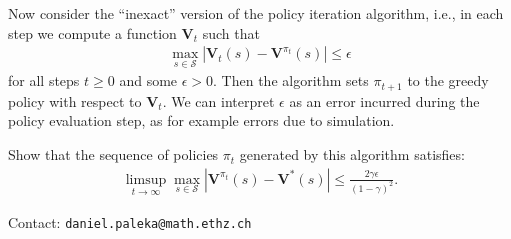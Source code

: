 Now consider the ``inexact'' version of the policy iteration algorithm, i.e., in each step we compute a function $\mathbf{V}_t$ such that
\begin{align*}
    \max_{s \in \mathcal{S}} | \mathbf{V}_t(s) - \mathbf{V}^{\pi_t}(s) | \le \epsilon
\end{align*}
for all steps $t \ge 0$ and some $\epsilon > 0$. Then the algorithm sets $\pi_{t+1}$ to the greedy policy with respect to $\mathbf{V}_t$. We can interpret $\epsilon$ as an error incurred during the policy evaluation step, as for example errors due to simulation. 

 Show that the sequence of policies $\pi_t$ generated by this algorithm satisfies:
\begin{align*}
    \limsup_{t \rightarrow \infty} \max_{s \in \mathcal{S}}  |\mathbf{V}^{\pi_t}(s) - \mathbf{V}^*(s)| \le \frac{2 \gamma \epsilon}{(1 - \gamma)^2}.
\end{align*}

Contact: \texttt{daniel.paleka@math.ethz.ch}



